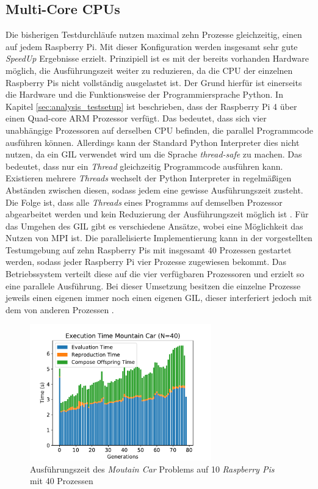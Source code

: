 \subsection{Multi-Core CPUs}
Die bisherigen Testdurchläufe nutzen maximal zehn Prozesse gleichzeitig, einen auf jedem Raspberry Pi. Mit dieser Konfiguration werden insgesamt sehr gute \emph{SpeedUp} Ergebnisse erzielt. Prinzipiell ist es mit der bereits vorhanden Hardware möglich, die Ausführungszeit weiter zu reduzieren, da die \ac{CPU} der einzelnen Raspberry Pis nicht vollständig ausgelastet ist. Der Grund hierfür ist einerseits die Hardware und die Funktionsweise der Programmiersprache Python. In Kapitel \ref{sec:analysis_testsetup} ist beschrieben, dass der Raspberry Pi 4 über einen Quad-core ARM Prozessor verfügt. Das bedeutet, dass sich vier unabhängige Prozessoren auf derselben \ac{CPU} befinden, die parallel Programmcode ausführen können. Allerdings kann der Standard Python Interpreter dies nicht nutzen, da ein \ac{GIL} verwendet wird um die Sprache \emph{thread-safe} zu machen. Das bedeutet, dass nur ein \emph{Thread} gleichzeitig Programmcode ausführen kann. Existieren mehrere \emph{Threads} wechselt der Python Interpreter in regelmäßigen Abständen zwischen diesen, sodass jedem eine gewisse Ausführungszeit zusteht. Die Folge ist, dass alle \emph{Threads} eines Programms auf demselben Prozessor abgearbeitet werden und kein Reduzierung der Ausführungszeit möglich ist \cite{marowka2018python}. Für das Umgehen des \ac{GIL} gibt es verschiedene Ansätze, wobei eine Möglichkeit das Nutzen von \ac{MPI} ist. Die parallelisierte Implementierung kann in der vorgestellten Testumgebung auf zehn Raspberry Pis mit insgesamt $40$ Prozessen gestartet werden, sodass jeder Raspberry Pi vier Prozesse zugewiesen bekommt. Das Betriebssystem verteilt diese auf die vier verfügbaren Prozessoren und erzielt so eine parallele Ausführung. Bei dieser Umsetzung besitzen die einzelne Prozesse jeweils einen eigenen  immer noch einen eigenen \ac{GIL}, dieser interferiert jedoch mit dem von anderen Prozessen \cite{marowka2018python}.
\begin{figure}[!h]
	\centering
	\includegraphics[width=0.7\textwidth]{./img/mountain_car_analysis/1413_time_40core_10pi.pdf} 
	\caption{Ausführungszeit des \emph{Moutain Car} Problems auf 10 \emph{Raspberry Pis} mit 40 Prozessen}
	\label{fig:mountain_car_time_40core_10pi}
\end{figure}
